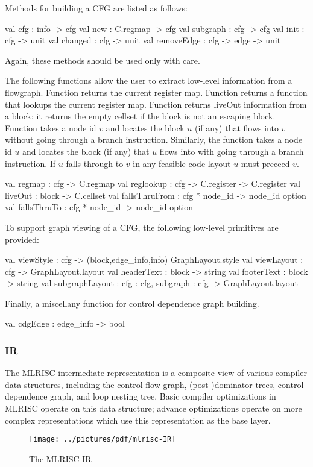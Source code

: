    Methods for building a CFG are listed as follows:
\begin{SML}
   val cfg      : info -> cfg    
   val new      : C.regmap -> cfg
   val subgraph : cfg -> cfg     
   val init     : cfg -> unit    
   val changed  : cfg -> unit   
   val removeEdge : cfg -> edge -> unit
\end{SML}
 Again, these methods should be used only with care.

  The following functions allow the user to extract low-level information
from a flowgraph.  Function  returns the current register map.
Function  returns a function that lookups the current register
map.  Function  returns liveOut information from a block;
it returns the empty cellset if the block is not an escaping block.
Function  takes a node id $v$ and locates the
block $u$ (if any) that flows into $v$ without going through a branch
instruction.  Similarly, the function   takes
a node id $u$ and locates the block (if any) that $u$ flows into
with going through a branch instruction.  If $u$ falls through to
$v$ in any feasible code layout $u$ must preceed $v$.
\begin{SML}
   val regmap    : cfg -> C.regmap
   val reglookup : cfg -> C.register -> C.register
   val liveOut   : block -> C.cellset
   val fallsThruFrom : cfg * node_id -> node_id option
   val fallsThruTo   : cfg * node_id -> node_id option
\end{SML}

   To support graph viewing of a CFG, the following low-level
primitives are provided: 
\begin{SML}
   val viewStyle      : cfg -> (block,edge_info,info) GraphLayout.style
   val viewLayout     : cfg -> GraphLayout.layout
   val headerText     : block -> string
   val footerText     : block -> string
   val subgraphLayout : { cfg : cfg, subgraph : cfg } -> GraphLayout.layout
\end{SML}

   Finally, a miscellany function for control dependence graph building.
\begin{SML} 
   val cdgEdge : edge_info -> bool
\end{SML}

\subsubsection{IR}
The MLRISC intermediate representation is a composite
view of various compiler data structures, including the control
flow graph, (post-)dominator trees, control dependence graph, and
loop nesting tree.   Basic compiler optimizations in MLRISC
operate on this data structure; advance optimizations
operate on more complex representations which use this
representation as the base layer.  
\begin{wrapfigure}{r}{4.5in}
   \begin{Boxit}
   \texttt{[image: ../pictures/pdf/mlrisc-IR]} 
   \end{Boxit}
   \caption{The MLRISC IR}
\end{wrapfigure}


